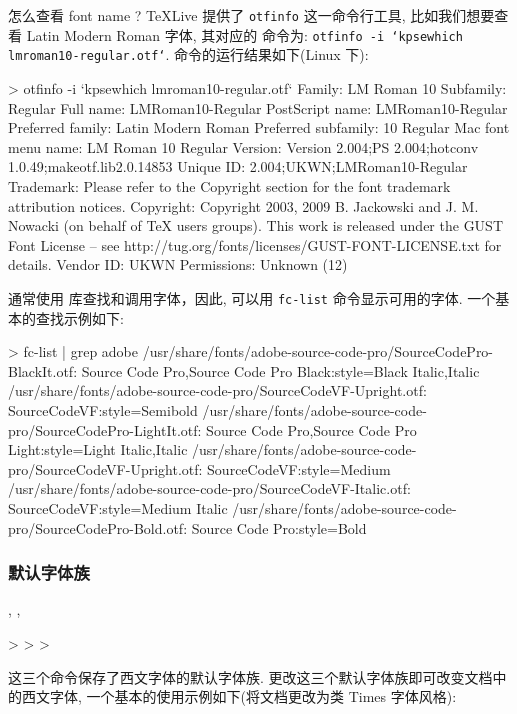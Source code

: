\clearpage
怎么查看 font name ? \TeX{}Live 提供了 \texttt{otfinfo} 这一命令行工具, 比如我们想要查看 Latin Modern Roman 字体, 其对应的
命令为: \texttt{otfinfo -i `kpsewhich lmroman10-regular.otf`}. 命令的运行结果如下(Linux 下):
\def\exampleUR{}
\begin{DocExample}[@@]
> otfinfo -i `kpsewhich lmroman10-regular.otf`
Family:              LM Roman 10
Subfamily:           Regular
Full name:           LMRoman10-Regular
PostScript name:     LMRoman10-Regular
Preferred family:    Latin Modern Roman
Preferred subfamily: 10 Regular
Mac font menu name:  LM Roman 10 Regular
Version:             Version 2.004;PS 2.004;hotconv 1.0.49;makeotf.lib2.0.14853
Unique ID:           2.004;UKWN;LMRoman10-Regular
Trademark:           Please refer to the Copyright section for the font trademark attribution notices.
Copyright:           Copyright 2003, 2009 B. Jackowski and J. M. Nowacki (on behalf of TeX users groups). This work is released under the GUST Font License --  see http://tug.org/fonts/licenses/GUST-FONT-LICENSE.txt for details.
Vendor ID:           UKWN
Permissions:         Unknown (12)
\end{DocExample}

\clearpage
{} 通常使用  库查找和调用字体，因此, 可以用 \texttt{fc-list} 命令显示可用的字体. 一个基本的查找示例如下:
\begin{DocExample}[@@]
> fc-list | grep adobe  
/usr/share/fonts/adobe-source-code-pro/SourceCodePro-BlackIt.otf: Source Code Pro,Source Code Pro Black:style=Black Italic,Italic
/usr/share/fonts/adobe-source-code-pro/SourceCodeVF-Upright.otf: SourceCodeVF:style=Semibold
/usr/share/fonts/adobe-source-code-pro/SourceCodePro-LightIt.otf: Source Code Pro,Source Code Pro Light:style=Light Italic,Italic
/usr/share/fonts/adobe-source-code-pro/SourceCodeVF-Upright.otf: SourceCodeVF:style=Medium
/usr/share/fonts/adobe-source-code-pro/SourceCodeVF-Italic.otf: SourceCodeVF:style=Medium Italic
/usr/share/fonts/adobe-source-code-pro/SourceCodePro-Bold.otf: Source Code Pro:style=Bold
\end{DocExample}
\resetExampleUR



\newpage
\subsubsection{默认字体族}
\begin{function}[added=2025-04-26]{\rmdefault, \sfdefault, \ttdefault}
  \begin{syntax}
    >
    >
    >
  \end{syntax}
  这三个命令保存了西文字体的默认字体族. 更改这三个默认字体族即可改变文档中的西文字体, 
  一个基本的使用示例如下(将文档更改为类 Times 字体风格):
\end{function}
\begin{DocExample}
\renewcommand{\rmdefault}{ptm}
\renewcommand{\sfdefault}{phv}
\renewcommand{\ttdefault}{pcr}
\end{DocExample}


